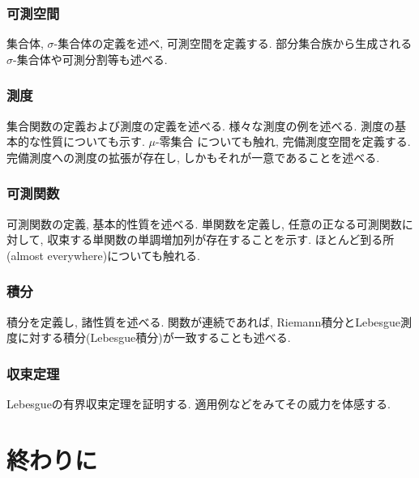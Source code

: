 \documentclass[a4j,dvipdfmx]{jsarticle}
\numberwithin{equation}{section}
\begin{document}
    \section{可測空間}
        集合体, $\sigma$-集合体の定義を述べ, 可測空間を定義する. 部分集合族から生成される$\sigma$-集合体や可測分割等も述べる.
    \clearpage
    \section{測度}
        集合関数の定義および測度の定義を述べる. 様々な測度の例を述べる. 測度の基本的な性質についても示す. $\mu$-零集合
        についても触れ, 完備測度空間を定義する. 完備測度への測度の拡張が存在し, しかもそれが一意であることを述べる.
    \clearpage
    \section{可測関数}
        可測関数の定義, 基本的性質を述べる. 単関数を定義し, 任意の正なる可測関数に対して, 収束する単関数の単調増加列が存在することを示す.
        ほとんど到る所(almost everywhere)についても触れる.
    \clearpage
    \section{積分}
        積分を定義し, 諸性質を述べる. 関数が連続であれば, Riemann積分とLebesgue測度に対する積分(Lebesgue積分)が一致することも述べる.
    \clearpage
    \section{収束定理}
        Lebesgueの有界収束定理を証明する. 適用例などをみてその威力を体感する.
    \clearpage
    \part{終わりに}
        \clearpage
    \printindex
\end{document}
